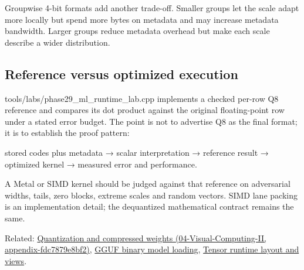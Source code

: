 Groupwise 4-bit formats add another trade-off. Smaller groups let the scale adapt more locally but spend more bytes on metadata and may increase metadata bandwidth. Larger groups reduce metadata overhead but make each scale describe a wider distribution.

\subsection{Reference versus optimized execution}\label{appendix-241c0e42ac2d-reference-versus-optimized-execution}

tools/labs/phase29\_ml\_runtime\_lab.cpp implements a checked per-row Q8 reference and compares its dot product against the original floating-point row under a stated error budget. The point is not to advertise Q8 as the final format; it is to establish the proof pattern:

stored codes plus metadata → scalar interpretation → reference result → optimized kernel → measured error and performance.

A Metal or SIMD kernel should be judged against that reference on adversarial widths, tails, zero blocks, extreme scales and random vectors. SIMD lane packing is an implementation detail; the dequantized mathematical contract remains the same.

Related: \href{../04-Visual-Computing-II/main.pdf\#nameddest=appendix-fdc7879e8bf2}{Quantization and compressed weights (04-Visual-Computing-II, appendix-fdc7879e8bf2)}, \hyperref[appendix-fef72dd246f2]{GGUF binary model loading}, \hyperref[appendix-cebadf3106d1]{Tensor runtime layout and views}.
